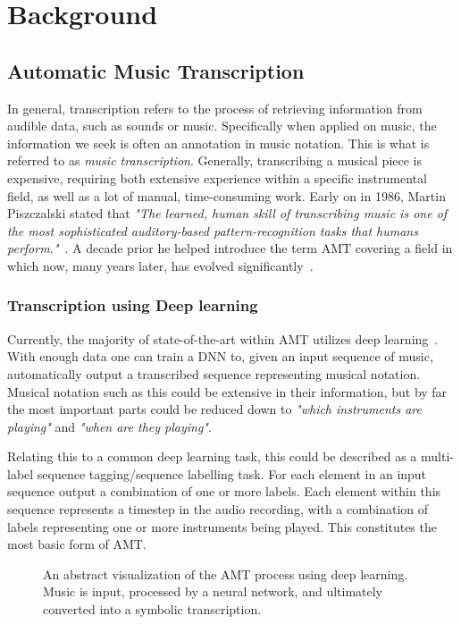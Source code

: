 \chapter{Background}\label{Background}

\section{Automatic Music Transcription}

In general, transcription refers to the process of retrieving information from audible data, such as sounds or music. Specifically when applied on music, the information we seek is often an annotation in music notation. This is what is referred to as \textit{music transcription}. Generally, transcribing a musical piece is expensive, requiring both extensive experience within a specific instrumental field, as well as a lot of manual, time-consuming work. Early on in 1986, Martin Piszczalski stated that \textit{"The learned, human skill of transcribing music is one of the most sophisticated auditory-based pattern-recognition tasks that humans perform."}~\cite{10.5555/15202}. A decade prior he helped introduce the term \acrfull{AMT} covering a field in which now, many years later, has evolved significantly~\cite{piszczalski1977automatic}.

\subsection{Transcription using Deep learning}
Currently, the majority of state-of-the-art within \gls{AMT} utilizes deep learning~\cite{8350302, signals4040042, jamshidi2024machine}. With enough data one can train a \gls{DNN} to, given an input sequence of music, automatically output a transcribed sequence representing musical notation. Musical notation such as this could be extensive in their information, but by far the most important parts could be reduced down to \textit{"which instruments are playing"} and \textit{"when are they playing"}.

Relating this to a common deep learning task, this could be described as a multi-label sequence tagging/sequence labelling task. For each element in an input sequence output a combination of one or more labels. Each element within this sequence represents a timestep in the audio recording, with a combination of labels representing one or more instruments being played. This constitutes the most basic form of \gls{AMT}.

\begin{figure}[H]
    \centering
    
    \caption{An abstract visualization of the \acrfull{AMT} process using deep learning. Music is input, processed by a neural network, and ultimately converted into a symbolic transcription.}
    \label{AMTFigure}
\end{figure}

